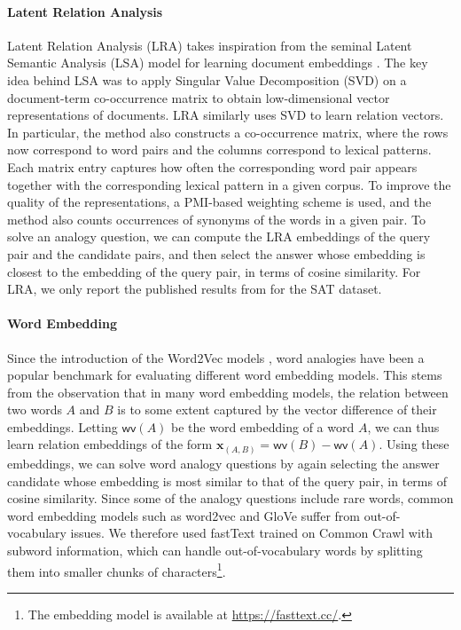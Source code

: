 \documentclass[3p]{elsarticle}
\begin{document}
{\paragraph{Latent Relation Analysis} 
Latent Relation Analysis (LRA) \cite{Turney:2005:MSS:1642293.1642475} takes inspiration from the seminal Latent Semantic Analysis (LSA) model for learning document embeddings \cite{DBLP:journals/jasis/DeerwesterDLFH90}. The key idea behind LSA was to apply Singular Value Decomposition (SVD) on a document-term co-occurrence matrix to obtain low-dimensional vector representations of documents. LRA similarly uses SVD to learn relation vectors. In particular, the method also constructs a co-occurrence matrix, where the rows now correspond to word pairs and the columns correspond to lexical patterns. Each matrix entry captures how often the corresponding word pair appears together with the corresponding lexical pattern in a given corpus. To improve the quality of the representations, a PMI-based weighting scheme is used, and the method also counts occurrences of synonyms of the words in a given pair. To solve an analogy question, we can compute the LRA embeddings of the query pair and the candidate pairs, and then select the answer whose embedding is closest to the embedding of the query pair, in terms of cosine similarity. For LRA, we only report the published results from \cite{Turney:2005:MSS:1642293.1642475} for the SAT dataset.

\paragraph{Word Embedding}
Since the introduction of the Word2Vec models \cite{mikolov2013distributed}, word analogies have been a popular benchmark for evaluating different word embedding models. This stems from the observation that in many word embedding models, the relation between two words $A$ and $B$ is to some extent captured by the vector difference of their embeddings. Letting $\mathsf{wv}(A)$ be the word embedding of a word $A$, we can thus learn relation embeddings of the form $\mathbf{x}_{(A,B)} = \mathsf{wv}(B) - \mathsf{wv}(A)$. Using these embeddings, we can solve word analogy questions by again selecting the answer candidate whose embedding is most similar to that of the query pair, in terms of cosine similarity. Since some of the analogy questions include rare words, common word embedding models such as word2vec \cite{mikolov2013distributed} and GloVe \cite{pennington-etal-2014-glove} suffer from out-of-vocabulary issues. We therefore used fastText \cite{bojanowski2016enriching} trained on Common Crawl with subword information, which can handle out-of-vocabulary words by splitting them into smaller chunks of characters\footnote{The embedding model is available at \url{https://fasttext.cc/}.}.


}
\end{document}
